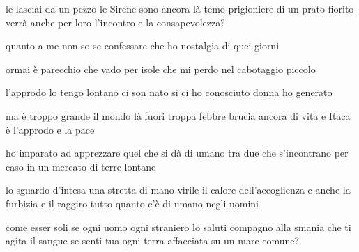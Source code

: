 \begin{poem}
	\begin{stanza}
		le lasciai da un pezzo le Sirene\verseline
		sono ancora là temo\verseline
		prigioniere di un prato fiorito\verseline
		verrà anche per loro l’incontro\verseline
		e la consapevolezza?
	\end{stanza}

	\begin{stanza}
		quanto a me\verseline
		non so se confessare che\verseline
		ho nostalgia di quei giorni
	\end{stanza}

	\begin{stanza}
		ormai è parecchio che vado per isole\verseline
		che mi perdo nel cabotaggio piccolo
	\end{stanza}

	\begin{stanza}
		l’approdo lo tengo lontano\verseline
		ci son nato sì\verseline
		ci ho conosciuto donna\verseline
		ho generato
	\end{stanza}

	\begin{stanza}
		ma è troppo grande il mondo là fuori\verseline
		troppa febbre brucia ancora di vita\verseline
		e Itaca è l’approdo e la pace
	\end{stanza}

	\begin{stanza}
		ho imparato ad apprezzare quel che si dà\verseline
		di umano tra due che s’incontrano per caso\verseline
		in un mercato di terre lontane
	\end{stanza}

	\begin{stanza}
		lo sguardo d’intesa\verseline
		una stretta di mano virile\verseline
		il calore dell’accoglienza\verseline
		e anche la furbizia e il raggiro\verseline
		tutto quanto c’è di umano negli uomini
	\end{stanza}

	\begin{stanza}
		come esser soli\verseline
		se ogni uomo\verseline
		ogni straniero\verseline
		lo saluti compagno\verseline
		alla smania che ti agita il sangue\verseline
		se senti tua ogni terra\verseline
		affacciata su un mare comune?
	\end{stanza}
\end{poem}

\clearpage


